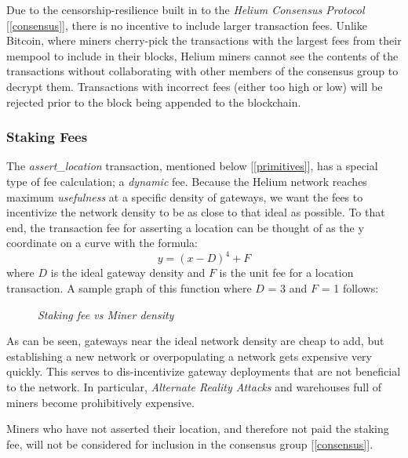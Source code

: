 \documentclass[10pt, nonatbib, nocopyrightspace, reprint]{sigplanconf}
\newcommand{\secref}[1]{[\autoref{#1}]}
\begin{document}
Due to the censorship-resilience built in to the \emph{Helium Consensus Protocol} \secref{consensus}, there is no incentive to include larger transaction fees. Unlike Bitcoin, where miners cherry-pick the transactions with the largest fees from their mempool to include in their blocks, Helium miners cannot see the contents of the transactions without collaborating with other members of the consensus group to decrypt them. Transactions with incorrect fees (either too high or low) will be rejected prior to the block being appended to the blockchain.

\subsubsection{Staking Fees} \label{staking}

The \emph{assert\_location} transaction, mentioned below \secref{primitives}, has a special type of fee calculation; a \emph{dynamic} fee. Because the Helium network reaches maximum \emph{usefulness} at a specific density of gateways, we want the fees to incentivize the network density to be as close to that ideal as possible. To that end, the transaction fee for asserting a location can be thought of as the y coordinate on a curve with the formula: \[\mathit{y = \left(x - D\right)^4 + F}\] where $D$ is the ideal gateway density and $F$ is the unit fee for a location transaction. A sample graph of this function where $D$ = 3 and $F$ = 1 follows:\\

\begin{figure}[ht]
  \centering
  \pgfplotsset{width=11cm,compat=newest}
  \caption{\emph{Staking fee vs Miner density}}
\end{figure}


As can be seen, gateways near the ideal network density are cheap to add, but establishing a new network or overpopulating a network gets expensive very quickly. This serves to dis-incentivize gateway deployments that are not beneficial to the network. In particular, \emph{Alternate Reality Attacks} and warehouses full of miners become prohibitively expensive.

Miners who have not asserted their location, and therefore not paid the staking fee, will not be considered for inclusion in the consensus group \secref{consensus}.
\end{document}
